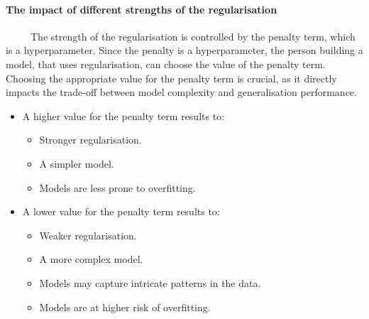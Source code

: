 \documentclass[12pt]{article}
\begin{document}
\paragraph{The impact of different strengths of the regularisation}~
\newline~
\newline~
The strength of the regularisation is controlled by the penalty term, which is a hyperparameter. Since the penalty is a hyperparameter, the person building a model,
that uses regularisation, can choose the value of the penalty term. \\ Choosing the appropriate value for the penalty term is crucial, as it directly impacts the trade-off
between model complexity and generalisation performance.
\begin{itemize}
    \item A higher value for the penalty term results to:
    \begin{itemize}
        \item Stronger regularisation.
        \item A simpler model.
        \item Models are less prone to overfitting.
    \end{itemize}
    \item A lower value for the penalty term results to:
    \begin{itemize}
        \item Weaker regularisation.
        \item A more complex model.
        \item Models may capture intricate patterns in the data.
        \item Models are at higher risk of overfitting.
    \end{itemize}
\end{itemize}
\end{document}
